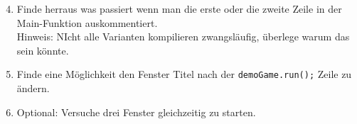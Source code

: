 \begin{enumerate}[label=\alph*)] \setcounter{enumi}{3}
    \item Finde herraus was passiert wenn man die erste oder die zweite Zeile in der Main-Funktion auskommentiert.\\
    Hinweis: NIcht alle Varianten kompilieren zwangsläufig, überlege warum das sein könnte.
    \item Finde eine Möglichkeit den Fenster Titel nach der \texttt{demoGame.run();} Zeile zu ändern.
    \item Optional: Versuche drei Fenster gleichzeitig zu starten.
\end{enumerate}
